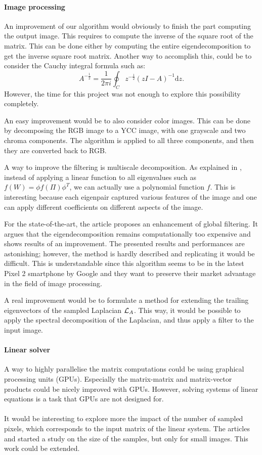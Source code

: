 \paragraph{Image processing}
An improvement of our algorithm would obviously to finish the part computing the output image.
This requires to compute the inverse of the square root of the matrix.
This can be done either by computing the entire eigendecomposition to get the inverse square root matrix.
Another way to accomplish this, could be to consider the Cauchy integral formula such as:
\[A^{-\frac{1}{2}} = \frac{1}{2\pi i} \oint_C z^{-\frac{1}{2}} (zI - A)^{-1} \mathrm{d}z.\]
However, the time for this project was not enough to explore this possibility completely.

An easy improvement would be to also consider color images.
This can be done by decomposing the RGB image to a YCC image, with one grayscale and two chroma components.
The algorithm is applied to all three components, and then they are converted back to RGB.

A way to improve the filtering is multiscale decomposition.
As explained in \cite{talebi_nonlocal_2014}, instead of applying a linear function to all eigenvalues such as \(f(W) = \phi f(\Pi) \phi^T\), we can actually use a polynomial function \(f\).
This is interesting because each eigenpair captured various features of the image and one can apply different coefficients on different aspects of the image.

For the state-of-the-art, the article \cite{talebi_fast_2016} proposes an enhancement of global filtering.
It argues that the eigendecomposition remains computationally too expensive and shows results of an improvement.
The presented results and performances are astonishing; however, the method is hardly described and replicating it would be difficult.
This is understandable since this algorithm seems to be in the latest Pixel 2 smartphone by Google and they want to preserve their market advantage in the field of image processing.

A real improvement would be to formulate a method for extending the trailing eigenvectors of the sampled Laplacian \(\operatorname{\mathcal{L}}_A\).
This way, it would be possible to apply the spectral decomposition of the Laplacian, and thus apply a filter to the input image.

\paragraph{Linear solver}
A way to highly parallelise the matrix computations could be using graphical processing units (GPUs).
Especially the matrix-matrix and matrix-vector products could be nicely improved with GPUs.
However, solving systems of linear equations is a task that GPUs are not designed for.

\paragraph{}
It would be interesting to explore more the impact of the number of sampled pixels, which corresponds to the input matrix of the linear system.
The articles \cite{fowlkes_spectral_2004} and \cite{glide_2014} started a study on the size of the samples, but only for small images.
This work could be extended.
